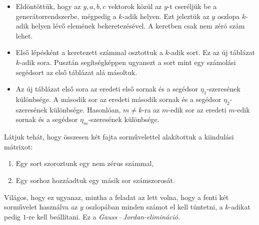 \documentclass[9pt, a4paper, showtrims]{memoir}
\theoremstyle{plain}
\theoremstyle{remark}
\theoremstyle{definition}
\begin{document}
\begin{itemize}
	\item
	      Eldöntöttük, hogy az $y,a,b,c$ vektorok közül az $y$-t cseréljük be a generátorrendszerbe,
	      mégpedig a $k$-adik helyen.
	      Ezt jeleztük az $y$ oszlopa $k$-adik helyen lévő elemének bekeretezésével.
	      A keretben csak nem zéró szám lehet.
	\item
	      Első lépésként a keretezett számmal osztottuk a $k$-adik sort. Ez az új táblázat $k$-adik sora.
	      Pusztán segítségképpen ugyanezt a sort mint egy számolási segédsort az első táblázat alá másoltuk.
	\item
	      Az új táblázat első sora az eredeti első sornak és a segédsor $\eta_1$-szeresének különbsége.
	      A második sor az eredeti második sornak és a segédsor $\eta_2$-szeresének különbsége.
	      Hasonlóan, $m\neq k$-ra az $m$-edik sor az eredeti $m$-edik sornak és a segédsor $\eta_m$-szeresének különbsége.
\end{itemize}

Látjuk tehát, hogy összesen két fajta sorművelettel alakítottuk a kiindulási mátrixot:
\begin{enumerate}
	\item Egy sort szoroztunk egy nem zérus számmal,
	\item Egy sorhoz hozzáadtuk egy másik sor számszorosát.
\end{enumerate}
Világos, hogy ez ugyanaz, mintha a feladat az lett volna,
hogy a fenti két sorművelet használva az $y$ oszlopában minden számot el kell tüntetni,
a $k$-adikat pedig $1$-re kell beállítani.
Ez a \emph{Gauss\,--\,Jordan-elimináció}.
\end{document}
